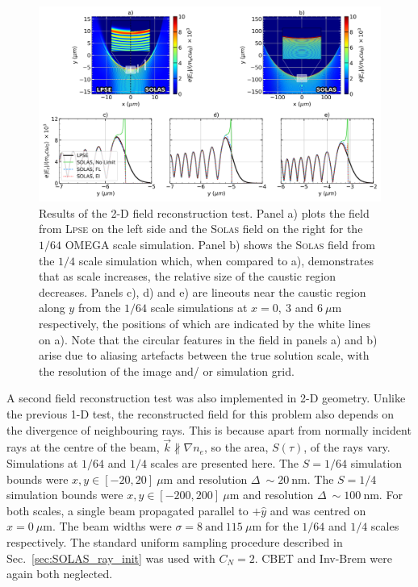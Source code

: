 \begin{figure}[t!]
    \includegraphics[width=1.0\linewidth]{Numerics/Images/2D_field_reconstruction_lineouts_alt.png}
    \centering
    \caption{Results of the 2-D field reconstruction test.
    Panel a) plots the field from \textsc{Lpse} on the left side and the \textsc{Solas} field on the right for the $1/64$ OMEGA scale simulation.
    Panel b) shows the \textsc{Solas} field from the $1/4$ scale simulation which, when compared to a), demonstrates that as scale increases, the relative size of the caustic region decreases.
    Panels c), d) and e) are lineouts near the caustic region along $y$ from the $1/64$ scale simulations at $x=0,\ 3$ and $6\ \mu\text{m}$ respectively, the positions of which are indicated by the white lines on a).
    Note that the circular features in the field in panels a) and b) arise due to aliasing artefacts between the true solution scale, with the resolution of the image and/ or simulation grid.}%
    \label{fig:SOLAS_2d_field_test}
\end{figure}

A second field reconstruction test was also implemented in 2-D geometry.
Unlike the previous 1-D test, the reconstructed field for this problem also depends on the divergence of neighbouring rays.
This is because apart from normally incident rays at the centre of the beam, $\vec{k}\nparallel\nabla n_e$, so the area, $S(\tau)$, of the rays vary.
Simulations at $1/64$ and $1/4$ scales are presented here.
The $S=1/64$ simulation bounds were $x,y\in [-20,20]\ \mu\text{m}$ and resolution $\Delta\ \sim 20\ \text{nm}$.
The $S=1/4$ simulation bounds were $x,y\in [-200,200]\ \mu\text{m}$ and resolution $\Delta\ \sim 100\ \text{nm}$.
For both scales, a single beam propagated parallel to $+\hat{y}$ and was centred on $x=0\ \mu\text{m}$.
The beam widths were $\sigma=8\ \text{and}\ 115\ \mu\text{m}$ for the $1/64$ and $1/4$ scales respectively.
The standard uniform sampling procedure described in Sec.~\ref{sec:SOLAS_ray_init} was used with $C_N=2$.
\ac{CBET} and \ac{Inv-Brem} were again both neglected.

